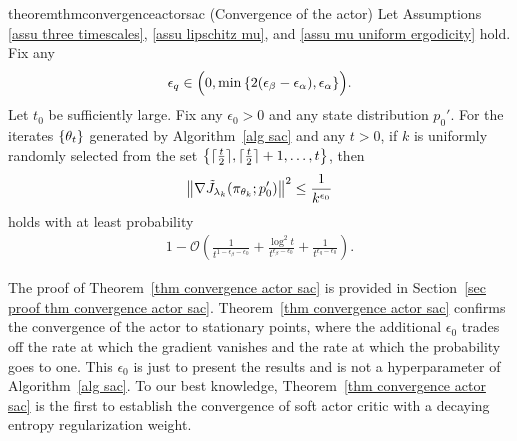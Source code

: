 \documentclass[twoside,11pt]{article}
\DeclarePairedDelimiter{\ceil}{\lceil}{\rceil}
\newcommand{\fO}{\mathcal{O}}
\numberwithin{assucounter}{section}
\begin{document}
\begin{restatable}{theorem}{thmconvergenceactorsac}
  \label{thm convergence actor sac}
  (Convergence of the actor)
  Let Assumptions \ref{assu three timescales}, \ref{assu lipschitz mu}, and \ref{assu mu uniform ergodicity} hold.
  Fix any 
  \begin{align}
    \epsilon_q \in \Big(0, \min\qty{2(\epsilon_\beta - \epsilon_\alpha), \epsilon_\alpha}\Big).
  \end{align}
  Let $t_0$ be sufficiently large.
  Fix any $\epsilon_0 > 0$ and any state distribution $p_0'$.
  For the iterates $\qty{\theta_t}$ generated by Algorithm~\ref{alg sac} and any $t > 0$,
  if $k$ is uniformly randomly selected from the set $\qty{\ceil{\frac{t}{2}}, \ceil{\frac{t}{2}} + 1, \dots, t}$,
  then
  \begin{align}
    \norm{\nabla \tilde J_{\lambda_k}(\pi_{\theta_k}; p_0')}^2 \leq \frac{1}{k^{\epsilon_0}}
  \end{align}
  holds with at least probability
  \begin{align}
    1 - \fO\left(\frac{1}{t^{1-\epsilon_\beta - \epsilon_0}} + \frac{\log^2t}{t^{\epsilon_\beta-\epsilon_0}} + \frac{1}{t^{\epsilon_q -\epsilon_0}}\right).
  \end{align}
\end{restatable}
\noindent The proof of Theorem~\ref{thm convergence actor sac} is provided in Section~\ref{sec proof thm convergence actor sac}.
Theorem~\ref{thm convergence actor sac} confirms the convergence of the actor to stationary points,
where the additional $\epsilon_0$ trades off the rate at which the gradient vanishes and the rate at which the probability goes to one.
This $\epsilon_0$ is just to present the results and is not a hyperparameter of Algorithm~\ref{alg sac}.
To our best knowledge,
Theorem~\ref{thm convergence actor sac} is the first to establish the convergence of soft actor critic with a decaying entropy regularization weight.
\end{document}
